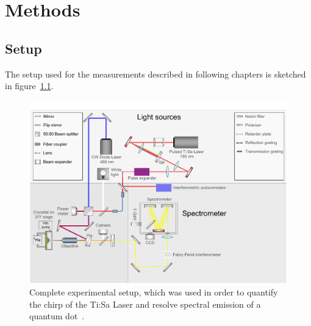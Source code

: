 \chapter{Methods}

\section{Setup}

The setup used for the measurements described in following chapters is sketched in figure~\ref{fig:setupflat}.

\begin{figure}[H]
	\centering
	\includegraphics[width=\linewidth]{figures/setup/Setup_flat}
	\caption[Complete experimental setup]{Complete experimental setup, which was used in order to quantify the chirp of the Ti:Sa Laser and resolve spectral emission of a quantum dot~\cite{schimpf_towards_2017}.}
	\label{fig:setupflat}
\end{figure}

